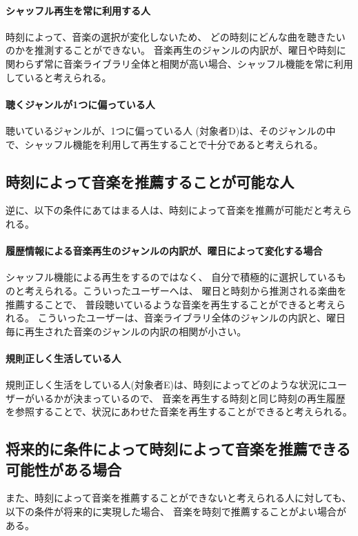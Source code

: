 \documentclass[a4paper, 11pt, onecolumn, report]{jsarticle}
\begin{document}
\paragraph{シャッフル再生を常に利用する人}
時刻によって、音楽の選択が変化しないため、
どの時刻にどんな曲を聴きたいのかを推測することができない。
音楽再生のジャンルの内訳が、曜日や時刻に関わらず常に音楽ライブラリ全体と相関が高い場合、シャッフル機能を常に利用していると考えられる。

\paragraph{聴くジャンルが1つに偏っている人}
聴いているジャンルが、1つに偏っている人 (対象者D)は、そのジャンルの中で、シャッフル機能を利用して再生することで十分であると考えられる。


\subsection{時刻によって音楽を推薦することが可能な人}
\par
逆に、以下の条件にあてはまる人は、時刻によって音楽を推薦が可能だと考えられる。
\paragraph{履歴情報による音楽再生のジャンルの内訳が、曜日によって変化する場合}
シャッフル機能による再生をするのではなく、
自分で積極的に選択しているものと考えられる。こういったユーザーへは、
曜日と時刻から推測される楽曲を推薦することで、
普段聴いているような音楽を再生することができると考えられる。
こういったユーザーは、音楽ライブラリ全体のジャンルの内訳と、曜日毎に再生された音楽のジャンルの内訳の相関が小さい。
\paragraph{規則正しく生活している人}
規則正しく生活をしている人(対象者E)は、時刻によってどのような状況にユーザーがいるかが決まっているので、
音楽を再生する時刻と同じ時刻の再生履歴を参照することで、状況にあわせた音楽を再生することができると考えられる。

\subsection{将来的に条件によって時刻によって音楽を推薦できる可能性がある場合}
また、時刻によって音楽を推薦することができないと考えられる人に対しても、
以下の条件が将来的に実現した場合、
音楽を時刻で推薦することがよい場合がある。
\end{document}
